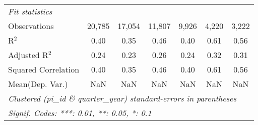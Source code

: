 \begin{tabular}{lcccccc}
   \midrule
   \emph{Fit statistics}\\
   Observations                                               & 20,785          & 17,054    & 11,807    & 9,926     & 4,220          & 3,222\\  
   R$^2$                                                      & 0.40            & 0.35      & 0.46      & 0.40      & 0.61           & 0.56\\  
   Adjusted R$^2$                                             & 0.24            & 0.23      & 0.26      & 0.24      & 0.32           & 0.31\\  
   Squared Correlation                                        & 0.40            & 0.35      & 0.46      & 0.40      & 0.61           & 0.56\\  
Mean(Dep. Var.) & NaN & NaN & NaN & NaN & NaN & NaN \\
   \midrule \midrule
   \multicolumn{7}{l}{\emph{Clustered (pi\_id \& quarter\_year) standard-errors in parentheses}}\\
   \multicolumn{7}{l}{\emph{Signif. Codes: ***: 0.01, **: 0.05, *: 0.1}}\\
\end{tabular}
\par\endgroup
